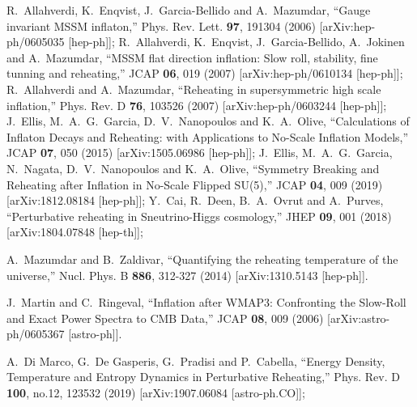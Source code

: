 \documentclass[%
aps,prd,nofootinbib,showkeys,a4paper,10pt
]{revtex4-2}
\begin{document}
\begin{thebibliography}{10}
R.~Allahverdi, K.~Enqvist, J.~Garcia-Bellido and A.~Mazumdar,
``Gauge invariant MSSM inflaton,''
Phys. Rev. Lett. \textbf{97}, 191304 (2006)
[arXiv:hep-ph/0605035 [hep-ph]];
R.~Allahverdi, K.~Enqvist, J.~Garcia-Bellido, A.~Jokinen and A.~Mazumdar,
``MSSM flat direction inflation: Slow roll, stability, fine tunning and reheating,''
JCAP \textbf{06}, 019 (2007)
[arXiv:hep-ph/0610134 [hep-ph]];
R.~Allahverdi and A.~Mazumdar,
``Reheating in supersymmetric high scale inflation,''
Phys. Rev. D \textbf{76}, 103526 (2007)
[arXiv:hep-ph/0603244 [hep-ph]];
J.~Ellis, M.~A.~G.~Garcia, D.~V.~Nanopoulos and K.~A.~Olive,
``Calculations of Inflaton Decays and Reheating: with Applications to No-Scale Inflation Models,''
JCAP \textbf{07}, 050 (2015)
[arXiv:1505.06986 [hep-ph]];
J.~Ellis, M.~A.~G.~Garcia, N.~Nagata, D.~V.~Nanopoulos and K.~A.~Olive,
``Symmetry Breaking and Reheating after Inflation in No-Scale Flipped SU(5),''
JCAP \textbf{04}, 009 (2019)
[arXiv:1812.08184 [hep-ph]];
Y.~Cai, R.~Deen, B.~A.~Ovrut and A.~Purves,
``Perturbative reheating in Sneutrino-Higgs cosmology,''
JHEP \textbf{09}, 001 (2018)
[arXiv:1804.07848 [hep-th]];



A.~Mazumdar and B.~Zaldivar,
``Quantifying the reheating temperature of the universe,''
Nucl. Phys. B \textbf{886}, 312-327 (2014)
[arXiv:1310.5143 [hep-ph]].


J.~Martin and C.~Ringeval,
``Inflation after WMAP3: Confronting the Slow-Roll and Exact Power Spectra to CMB Data,''
JCAP \textbf{08}, 009 (2006)
[arXiv:astro-ph/0605367 [astro-ph]].

A.~Di Marco, G.~De Gasperis, G.~Pradisi and P.~Cabella,
``Energy Density, Temperature and Entropy Dynamics in Perturbative Reheating,''
Phys. Rev. D \textbf{100}, no.12, 123532 (2019)
[arXiv:1907.06084 [astro-ph.CO]];






\end{thebibliography}
\end{document}
